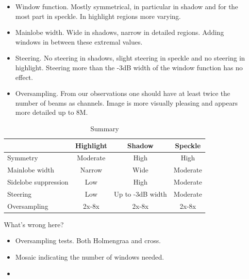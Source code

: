 \documentclass[10pt,journal,draftclsnofoot,onecolumn]{IEEEtran}
\let\MYoriglatexcaption\caption               %
\renewcommand{\caption}[2][\relax]{\MYoriglatexcaption[#2]{#2}}
\newcommand\1{\vec 1}
\begin{document}
\begin{itemize}
\item Window function. Mostly symmetrical, in particular in shadow and for the most part in speckle. In highlight regions more varying.
\item Mainlobe width. Wide in shadows, narrow in detailed regions. Adding windows in between these extremal values.
\item Steering. No steering in shadows, slight steering in speckle and no steering in highlight. Steering more than the -3dB width of the window function has no effect.
\item Oversampling. From our observations one should have at least twice the number of beams as channels. Image is more visually pleasing and appears more detailed up to 8M.
\end{itemize}
\begin{table}[!b]\centering%
\begin{tabular}[c]{l c c c}\hline
\rowcolor{tabBlue} & \bf Highlight & \bf Shadow & \bf Speckle  \\\hline
Symmetry             & Moderate  & High   & High \\
Mainlobe width       & Narrow    & Wide   & Moderate \\
Sidelobe suppression & Low       & High   & Moderate \\
Steering             & Low       & Up to -3dB width & Moderate \\
Oversampling         & 2x-8x     & 2x-8x  & 2x-8x
\end{tabular}
\caption{Summary}\label{tab:summary}
\end{table}%


\newpage



\newpage

What's wrong here? 



\begin{itemize}
\item Oversampling tests. Both Holmengraa and cross.
\item Mosaic indicating the number of windows needed.
\item 
\end{itemize}
\end{document}
